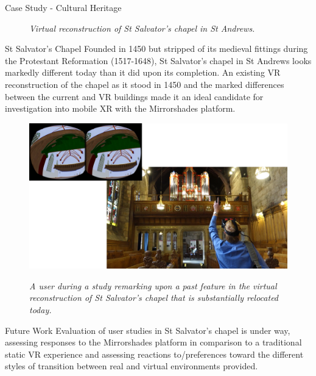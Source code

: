 \documentclass[final,t]{beamer}
\begin{document}
\begin{frame}
\begin{columns}[t]
\begin{column}{.31\linewidth}
\begin{block}{Case Study - Cultural Heritage}
\begin{figure}[h]
\begin{center}
					\textit{Virtual reconstruction of St Salvator's chapel in St Andrews.}
				\end{center}
			\end{figure}
    		
    		
		\end{block}

		\begin{block}{St Salvator's Chapel}
			Founded in 1450 but stripped of its medieval fittings during the Protestant Reformation (1517-1648), St Salvator's chapel in St Andrews looks markedly different today than it did upon its completion. An existing VR reconstruction of the chapel as it stood in 1450 and the marked differences between the current and VR buildings made it an ideal candidate for investigation into mobile XR with the Mirrorshades platform.
			
			\vspace{2mm}
			
			\begin{figure}[h]
				\begin{center}
					\includegraphics[width=\linewidth]{images/experiment_picture_dual.png}
					
					\textit{A user during a study remarking upon a past feature in the virtual reconstruction of St Salvator's chapel that is substantially relocated today.}
				\end{center}
			\end{figure}
		\end{block}
	       	
		\begin{block}{Future Work}
			Evaluation of user studies in St Salvator's chapel is under way, assessing responses to the Mirrorshades platform in comparison to a traditional static VR experience and assessing reactions to/preferences toward the different styles of transition between real and virtual environments provided.

		\end{block}
    
	\end{column}
    
  \end{columns}
 
\end{frame}
\end{document}
